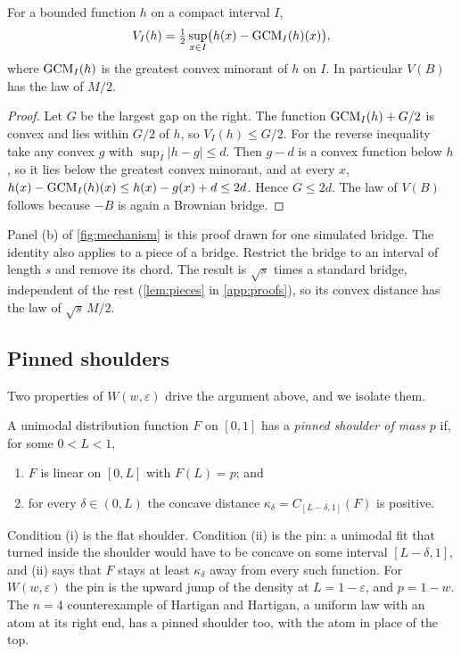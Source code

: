 \begin{lemma}\label{lem:halfgap}
For a bounded function $h$ on a compact interval $I$,
\[
V_I(h)=\tfrac12\sup_{x\in I}\bigl(h(x)-\operatorname{GCM}_I(h)(x)\bigr),
\]
where $\operatorname{GCM}_I(h)$ is the greatest convex minorant of $h$ on $I$. In particular $V(B)$ has the law of $M/2$.
\end{lemma}
\begin{proof}
Let $G$ be the largest gap on the right. The function $\operatorname{GCM}_I(h)+G/2$ is convex and lies within $G/2$ of $h$, so $V_I(h)\le G/2$. For the reverse inequality take any convex $g$ with $\sup_I|h-g|\le d$. Then $g-d$ is a convex function below $h$, so it lies below the greatest convex minorant, and at every $x$, $h(x)-\operatorname{GCM}_I(h)(x)\le h(x)-g(x)+d\le2d$. Hence $G\le2d$. The law of $V(B)$ follows because $-B$ is again a Brownian bridge.
\end{proof}

Panel (b) of \cref{fig:mechanism} is this proof drawn for one simulated bridge. The identity also applies to a piece of a bridge. Restrict the bridge to an interval of length $s$ and remove its chord. The result is $\sqrt s$ times a standard bridge, independent of the rest (\cref{lem:pieces} in \cref{app:proofs}), so its convex distance has the law of $\sqrt s\,M/2$.

\subsection{Pinned shoulders}
Two properties of $W(w,\varepsilon)$ drive the argument above, and we isolate them.

\begin{definition}\label{def:shoulder}
A unimodal distribution function $F$ on $[0,1]$ has a \emph{pinned shoulder of mass $p$} if, for some $0<L<1$,
\begin{enumerate}[label=(\roman*),leftmargin=*]
\item $F$ is linear on $[0,L]$ with $F(L)=p$; and
\item for every $\delta\in(0,L)$ the concave distance $\kappa_\delta=C_{[L-\delta,1]}(F)$ is positive.
\end{enumerate}
\end{definition}
Condition (i) is the flat shoulder. Condition (ii) is the pin: a unimodal fit that turned inside the shoulder would have to be concave on some interval $[L-\delta,1]$, and (ii) says that $F$ stays at least $\kappa_\delta$ away from every such function. For $W(w,\varepsilon)$ the pin is the upward jump of the density at $L=1-\varepsilon$, and $p=1-w$. The $n=4$ counterexample of Hartigan and Hartigan, a uniform law with an atom at its right end, has a pinned shoulder too, with the atom in place of the top.

